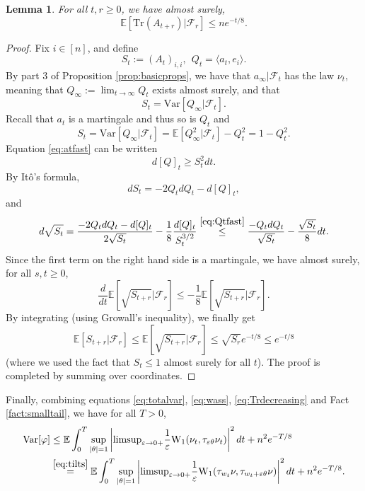 \documentclass[12pt]{article}
\def \EE {\mathbb E}
\def \Var {\mathrm{Var}}
\def \eps {\varepsilon}
\def \limsup {\mathrm{limsup}}
\def \FF {\mathcal{F}}
\newtheorem{lemma}[theorem]{Lemma}
\theoremstyle{definition}
\theoremstyle{remark}
\begin{document}
\begin{lemma}
For all $t,r \geq 0$, we have almost surely,
\begin{equation}\label{eq:Trdecreasing}
\EE[\mathrm{Tr}(A_{t+r}) | \FF_r] \leq n e^{-t/8}.
\end{equation}
\end{lemma}
\begin{proof}
Fix $i \in [n]$, and define 
$$
S_t := (A_t)_{i,i}, ~~ Q_t = \langle a_t, e_i \rangle.
$$ 
By part 3 of Proposition \ref{prop:basicprops}, we have that $a_\infty | \FF_t$ has the law $\nu_t$, meaning that $Q_\infty := \lim_{t \to \infty} Q_t$ exists almost surely, and that
$$
S_t = \Var[Q_\infty | \FF_t].
$$
Recall that $a_t$ is a martingale and thus so is $Q_t$ and
$$
S_t = \Var[Q_\infty | \FF_t] = \EE[Q_\infty^2 | \FF_t] - Q_t^2 = 1 - Q_t^2.
$$
Equation \eqref{eq:atfast} can be written
\begin{equation}\label{eq:Qtfast}
d [Q]_t \geq S_t^2 dt.
\end{equation}
By It\^o's formula,
$$
d S_t = - 2 Q_t d Q_t - d [Q]_t,
$$
and
$$
d \sqrt{S_t} = \frac{ - 2 Q_t d Q_t - d [Q]_t }{2 \sqrt{S_t}} - \frac{1}{8} \frac{d [Q]_t}{ S_t^{3/2} } \stackrel{\eqref{eq:Qtfast}}{\leq } \frac{ - Q_t d Q_t }{ \sqrt{S_t}} - \frac{\sqrt{S_t}}{8} dt.
$$
Since the first term on the right hand side is a martingale, we have almost surely, for all $s,t \geq 0$,
$$
\frac{d}{dt} \EE[ \sqrt{S_{t+r}} | \FF_r ] \leq - \frac{1}{8} \EE[ \sqrt{S_{t+r}} | \FF_r ].
$$
By integrating (using Growall's inequality), we finally get
$$
\EE [ S_{t+r} | \FF_r ] \leq \EE [ \sqrt{S_{t+r}} | \FF_r ] \leq \sqrt{S_r} e^{-t/8} \leq e^{-t/8}
$$
(where we used the fact that $S_t \leq 1$ almost surely for all $t$). The proof is completed by summing over coordinates.
\end{proof}
Finally, combining equations \eqref{eq:totalvar}, \eqref{eq:wass}, \eqref{eq:Trdecreasing} and Fact \ref{fact:smalltail}, we have for all $T>0$, 
\begin{align}
\Var[\varphi] & \leq \EE \int_0^T  \sup_{|\theta|=1}  \left | \limsup_{\eps \to 0+} \frac{1}{\eps} \mathrm{W}_1(\nu_t, \tau_{\eps \theta} \nu_t) \right |^2 dt + n^2 e^{-T/8} \nonumber \\
& \stackrel{\eqref{eq:tilts}}{=} \EE \int_0^T  \sup_{|\theta|=1}  \left | \limsup_{\eps \to 0+} \frac{1}{\eps} \mathrm{W}_1(\tau_{w_t} \nu, \tau_{w_t + \eps \theta} \nu) \right |^2 dt + n^2 e^{-T/8}.  \label{eq:finalvarbound}
\end{align}
\end{document}
